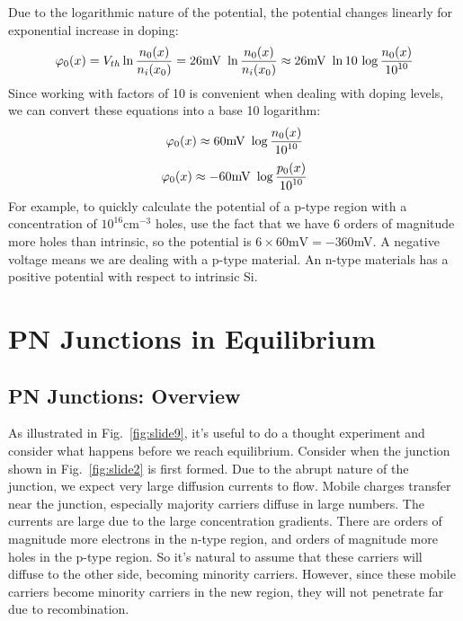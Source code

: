 Due to the logarithmic nature of the potential, the potential changes linearly for exponential increase in doping:
%
\begin{equation} 
	{\varphi _0}(x) = {V_{th}}\ln \frac{{{n_0}(x)}}{{{n_i}({x_0})}} = 26{\rm{mV}}\,\,\ln \frac{{{n_0}(x)}}{{{n_i}({x_0})}} \approx 26{\rm{mV}}\,\,\ln 10\,\log \frac{{{n_0}(x)}}{{{{10}^{10}}}} 
\end{equation}
%
Since working with factors of 10 is convenient when dealing with doping levels, we can convert these equations into a base 10 logarithm:
%
\begin{equation} 
	{\varphi _0}(x) \approx 60{\rm{mV}}\,\,\log \frac{{{n_0}(x)}}{{{{10}^{10}}}} 
\end{equation}
%
\begin{equation} 
	{\varphi _0}(x) \approx  - 60{\rm{mV}}\,\,\log \frac{{{p_0}(x)}}{{{{10}^{10}}}} 
\end{equation}
%
For example, to quickly calculate the potential of a p-type region with a concentration of $10^{16} \mathrm{cm}^{-3}$ holes, use the fact that we have 6 orders of magnitude more holes than intrinsic, so the potential is $6 \times 60\mathrm{mV} = -360 $mV.  A negative voltage means we are dealing with a p-type material.  An n-type materials has a positive potential with respect to intrinsic Si.
 


\section{PN Junctions in Equilibrium}


\subsection{PN Junctions: Overview}

As illustrated in Fig.~\ref{fig:slide9}, it's useful to do a thought experiment and consider what happens before we reach equilibrium.  Consider when the junction shown in Fig.~\ref{fig:slide2}  is first formed.  Due to the abrupt nature of the junction, we expect very large diffusion currents to flow.   Mobile charges transfer near the junction, especially majority carriers diffuse in large numbers.  The currents are large due to the large concentration gradients.  There are orders of magnitude more electrons in the n-type region, and orders of magnitude more holes in the p-type region.  So it's natural to assume that these carriers will diffuse to the other side, becoming minority carriers.  However, since these mobile carriers become minority carriers in the new region, they will not penetrate far due to recombination.  


